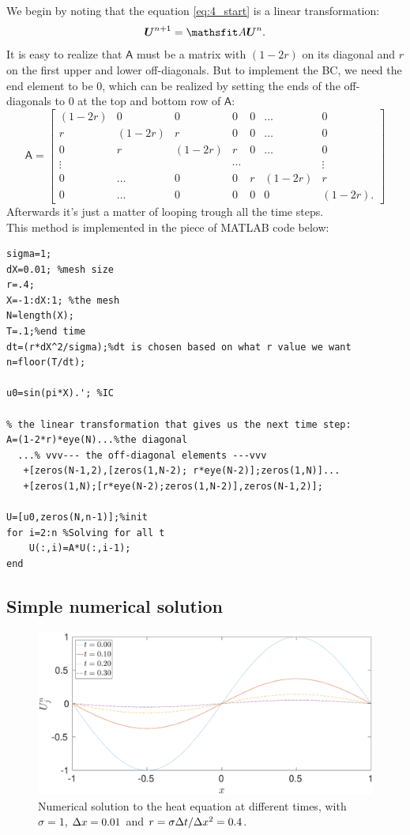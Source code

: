 \documentclass[11pt,letter, swedish, english
]{article}
\begin{document}
We begin by noting that the equation \eqref{eq:4_start} is a linear
transformation:
\begin{equation}
\vb*{U}^{n+1}=\mathsf{A}\vb*{U}^n.
\end{equation}
It is easy to realize that $\mathsf{A}$ must be a matrix with
$(1-2r)$ on its diagonal and $r$ on the first upper and lower
off-diagonals. But to implement the BC, we need the end element to be
0, which can be realized by setting the ends of the off-diagonals to 0
at the top and bottom row of $\mathsf{A}$:
\begin{equation}
\mathsf{A}=
\begin{bmatrix}
(1-2r)&0&0&0&0&\ldots&0\\
r&(1-2r)&r&0&0&\ldots&0\\
0&r&(1-2r)&r&0&\ldots&0\\
\vdots& & & \cdots& &&\vdots\\
0&\ldots&0 &0&r&(1-2r)&r\\
0&\ldots&0 &0&0& 0&(1-2r).
\end{bmatrix}
\end{equation}
Afterwards it's just a matter of looping trough all the time steps. 
\\[11pt]
This method is implemented in the piece of MATLAB code below:
\vspace{-14pt}
\begin{lstlisting}
sigma=1;
dX=0.01; %mesh size
r=.4;
X=-1:dX:1; %the mesh
N=length(X);
T=.1;%end time
dt=(r*dX^2/sigma);%dt is chosen based on what r value we want
n=floor(T/dt);

u0=sin(pi*X).'; %IC

% the linear transformation that gives us the next time step:
A=(1-2*r)*eye(N)...%the diagonal
  ...% vvv--- the off-diagonal elements ---vvv
   +[zeros(N-1,2),[zeros(1,N-2); r*eye(N-2)];zeros(1,N)]...
   +[zeros(1,N);[r*eye(N-2);zeros(1,N-2)],zeros(N-1,2)];

U=[u0,zeros(N,n-1)];%init
for i=2:n %Solving for all t
    U(:,i)=A*U(:,i-1);
end
\end{lstlisting}


\subsection{Simple numerical solution}
\begin{figure}\centering
\includegraphics[width=1\textwidth]{4a.eps}
\caption{Numerical solution to the heat equation at different times,
  with $\sigma=1$, $\Delta{x}=0.01$ and $r=\sigma\Delta{t}/\Delta{x}^2=0.4$. }
\label{fig:4a}
\end{figure}
\end{document}
